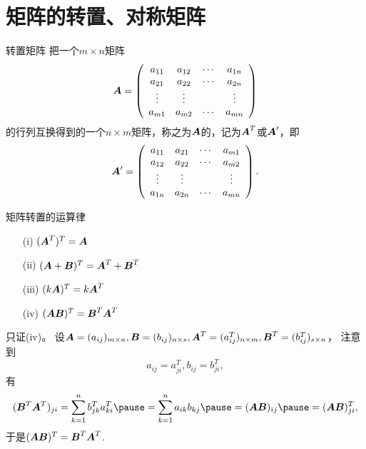\section{矩阵的转置、对称矩阵}

\begin{frame}
  \begin{footnotesize}
    \begin{block}{转置矩阵}
      把一个$m\times n$矩阵
      $$
      \boldsymbol{A} = \left(
      \begin{array}{cccc}
        a_{11} & a_{12} & \cdots & a_{1n} \\
        a_{21} & a_{22} & \cdots & a_{2n} \\
        \vdots   & \vdots &  & \vdots \\
        a_{m1} & a_{m2} & \cdots & a_{mn} 
      \end{array}
      \right)
      $$
      的行列互换得到的一个$n\times m$矩阵，称之为$\boldsymbol{A}$的，记为$\boldsymbol{A}^T$或$\boldsymbol{A}^\prime$，即
      $$
      \boldsymbol{A}^\prime = \left(
      \begin{array}{cccc}
        a_{11} & a_{21} & \cdots & a_{m1} \\
        a_{12} & a_{22} & \cdots & a_{m2} \\
        \vdots   & \vdots &  & \vdots \\
        a_{1n} & a_{2n} & \cdots & a_{mn} 
      \end{array}
      \right).
      $$
      
    \end{block}
    
  \end{footnotesize}
\end{frame}


\begin{frame}
  \begin{footnotesize}
    \begin{block}{矩阵转置的运算律}
      \begin{itemize}
      \item[(i)] $(\boldsymbol{A}^T)^T=\boldsymbol{A}$\\[0.2cm]
      \item[(ii)] $(\boldsymbol{A}+\boldsymbol{B})^T=\boldsymbol{A}^T+\boldsymbol{B}^T$\\[0.2cm]
      \item[(iii)] $(k\boldsymbol{A})^T= k\boldsymbol{A}^T$\\[0.2cm]
      \item[(iv)] $(\boldsymbol{A}\boldsymbol{B})^T=\boldsymbol{B}^T\boldsymbol{A}^T$
      \end{itemize}
    \end{block}
    \pause
    \proofname
    只证(iv)。 设$\boldsymbol{A}=(a_{ij})_{m\times n}, \boldsymbol{B}=(b_{ij})_{n\times s}, \boldsymbol{A}^T=(a_{ij}^T)_{n\times m}, \boldsymbol{B}^T=(b_{ij}^T)_{s\times n}$，
    注意到
    $$a_{ij} = a_{ji}^T, b_{ij} = b_{ji}^T,$$ \pause 
    有
    $$
    (\B^T\A^T)_{ji} = \sum_{k=1}^n b_{jk}^Ta_{ki}^T \pause = \sum_{k=1}^n a_{ik}b_{kj} \pause = (\A\B)_{ij} \pause = (\A\B)_{ji}^T,
    $$\pause 
    于是$(\boldsymbol{A}\boldsymbol{B})^T=\boldsymbol{B}^T\boldsymbol{A}^T$.
  \end{footnotesize}
\end{frame}


